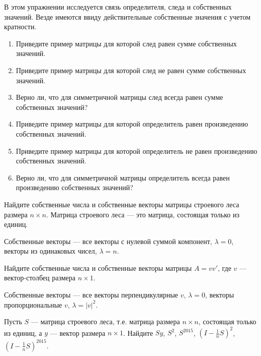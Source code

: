 \begin{problem}
В этом упражнении исследуется связь определителя, следа и собственных значений. Везде имеются ввиду действительные собственные значения с учетом кратности.
\begin{enumerate}
\item Приведите пример матрицы для которой след равен сумме собственных значений.
\item Приведите пример матрицы для которой след не равен сумме собственных значений.
\item Верно ли, что для симметричной матрицы след всегда равен сумме собственных значений?
\item Приведите пример матрицы для которой определитель равен произведению собственных значений.
\item Приведите пример матрицы для которой определитель не равен произведению собственных значений.
\item Верно ли, что для симметричной матрицы определитель всегда равен произведению собственных значений?
\end{enumerate}


\begin{sol}
\end{sol}
\end{problem}



\begin{problem}
Найдите собственные числа и собственные векторы матрицы строевого леса размера $n\times n$. Матрица строевого леса — это матрица, состоящая только из единиц.

\begin{sol}
Собственные векторы — все векторы с нулевой суммой компонент, $\lambda=0$, векторы из одинаковых чисел, $\lambda=n$.
\end{sol}
\end{problem}


\begin{problem}
Найдите собственные числа и собственные векторы матрицы $A=vv'$, где $v$ — вектор-столбец размера $n\times 1$.

\begin{sol}
Собственные векторы — все векторы перпендикулярные $v$, $\lambda=0$, векторы пропорциональные $v$, $\lambda=|v|^2$.
\end{sol}
\end{problem}


\begin{problem}
Пусть $S$ — матрица строевого леса, т.е. матрица размера $n\times n$, состоящая только из единиц, а $y$ — вектор размера $n\times 1$. Найдите $Sy$, $S^2$, $S^{2015}$, $(I-\frac{1}{n}S)^2$, $(I-\frac{1}{n}S)^{2015}$.

\begin{sol}
\end{sol}
\end{problem}

